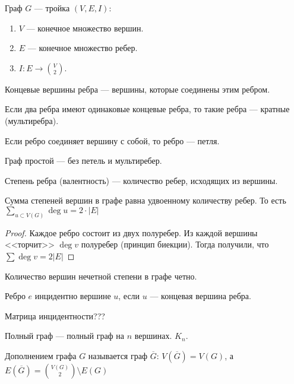 \begin{definition}
    Граф $G$ --- тройка  $(V, E, I)$:
     \begin{enumerate}
        \item $V$ --- конечное множество вершин.
        \item  $E$ --- конечное множество ребер.
        \item  $I\!: E \to \binom{V}{2}$.
    \end{enumerate}
\end{definition}
\begin{definition}
    Концевые вершины ребра --- вершины, которые соединены этим ребром.
\end{definition}
\begin{definition}
    Если два ребра имеют одинаковые концевые ребра, то такие ребра --- кратные (мультиребра).
\end{definition}
\begin{definition}
    Если ребро соединяет вершину с собой, то ребро --- петля.
\end{definition}
\begin{definition}
    Граф простой --- без петель и мультиребер.
\end{definition}
\begin{definition}
    Степень ребра (валентность) --- количество ребер, исходящих из вершины.
\end{definition}
\begin{theorem}
    Сумма степеней вершин в графе равна удвоенному количеству ребер. То есть $\displaystyle \sum_{u \subset V(G)} \deg u = 2 \cdot |E|$
\end{theorem}
\begin{proof}
    Каждое ребро состоит из двух полуребер. Из каждой вершины <<торчит>> $\deg v$ полуребер (принцип биекции). Тогда получили, что  $\sum \deg v = 2|E|$
\end{proof}
\begin{consequence}
    Количество вершин нечетной степени в графе четно.
\end{consequence}
\begin{definition}
    Ребро $e$ инцидентно вершине $u$, если  $u$ --- концевая вершина ребра. 
\end{definition}

\begin{definition}
    Матрица инцидентности???
\end{definition}

\begin{definition}
    Полный граф --- полный граф на $n$ вершинах.  $K_n$.
\end{definition}
\begin{definition}
    Дополнением графа $G$ называется граф  $\overline{G}$:  $V(\overline{G}) = V(G)$, а $E(\overline{G}) = \binom{V(G)}{2} \setminus E(G)$ 
\end{definition}

